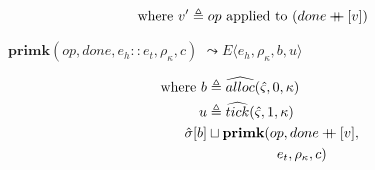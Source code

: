 \documentclass[12pt,draft]{article}
\newcommand\mdoubleplus{\ensuremath{\mathbin{+\mkern-9mu+}}}
\begin{document}
\begin{multicols*}{2}
\begin{align*}
\text{where } v' &\triangleq op \text{ applied to } (done \mdoubleplus [v])
\end{align*}
\begin{center}
  $\textbf{primk}(op, done, e_h::e_t, \rho_\kappa, c)$
  $\leadsto E\langle e_h , \rho_\kappa , b , u \rangle$
\end{center}
\vspace{-7mm}
\begin{align*}
\text{where } b &\triangleq \widehat{alloc}(\hat{\varsigma}, 0, \kappa) \\
u &\triangleq \widehat{tick}(\hat{\varsigma}, 1, \kappa) \\
\hat{\sigma}[b] &\sqcup \textbf{primk}(op, done \mdoubleplus [v], \\
&\;\;\;\;\;\;\;\;\;\;\;\;\;\;\;\;\;\; e_t, \rho_{\kappa}, c)
\end{align*}
\end{multicols*}


\newpage
\end{document}
